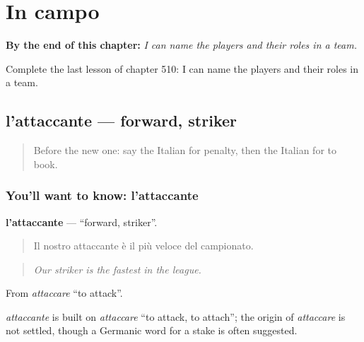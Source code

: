 
\chapter{In campo}
\label{ch:it-in-campo}

\begin{chapteropening}
\textbf{By the end of this chapter:} \emph{I can name the players and their roles in a team.}

Complete the last lesson of chapter 510: I can name the players and their roles in a team.
\end{chapteropening}

\section[l'attaccante]{l'attaccante — forward, striker}

\label{lesson:IT-C510-attaccante}



\begin{quote}
Before the new one: say the Italian for penalty, then the Italian for to book.
\end{quote}

\subsection*{You'll want to know: l'attaccante}
\textbf{l'attaccante} — \textquotedblleft{}forward, striker\textquotedblright{}.

\begin{quote}
Il nostro attaccante è il più veloce del campionato.
\end{quote}

\begin{quote}
\emph{Our striker is the fastest in the league.}
\end{quote}

From \emph{attaccare} \textquotedblleft{}to attack\textquotedblright{}.

\begin{cousinweb}
\emph{attaccante} is built on \emph{attaccare} \textquotedblleft{}to attack, to attach\textquotedblright{}; the origin of \emph{attaccare} is not settled, though a Germanic word for a stake is often suggested.
\end{cousinweb}

